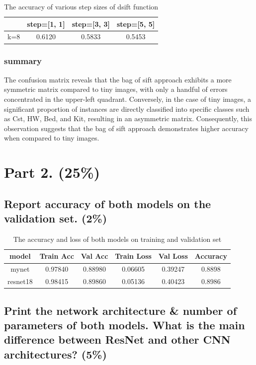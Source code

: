 \documentclass[a4paper, 12pt]{article}
\begin{document}
\begin{table}[!htb]
  \centering
  \caption{The accuracy of various step sizes of dsift function}
  \begin{tabular}{|c|c|c|c|}
    \hline
        & step=[1, 1] & step=[3, 3] & step=[5, 5] \\
    \hline
    k=8 & 0.6120      & 0.5833      & 0.5453      \\
    \hline
  \end{tabular}
\end{table}

\subsubsection{summary}
The confusion matrix reveals that the bag of sift approach exhibits a more symmetric matrix compared to tiny images, with only a handful of errors concentrated in the upper-left quadrant. Conversely, in the case of tiny images, a significant proportion of instances are directly classified into specific classes such as Cst, HW, Bed, and Kit, resulting in an asymmetric matrix. Consequently, this observation suggests that the bag of sift approach demonstrates higher accuracy when compared to tiny images.

\section{Part 2. (25\%)}
\subsection{Report accuracy of both models on the validation set. (2\%)}
\begin{table}[!htb]
  \centering
  \caption{The accuracy and loss of both models on training and validation set}
  \begin{tabular}{|c|c|c|c|c|c|}
    \hline
    model    & Train Acc & Val Acc & Train Loss & Val Loss & Accuracy \\
    \hline
    mynet    & 0.97840   & 0.88980 & 0.06605    & 0.39247  & 0.8898   \\
    \hline
    resnet18 & 0.98415   & 0.89860 & 0.05136    & 0.40423  & 0.8986   \\
    \hline
  \end{tabular}
\end{table}

\subsection{Print the network architecture \& number of parameters of both models. What is the main difference between ResNet and other CNN architectures? (5\%)}
\end{document}
